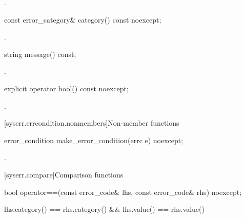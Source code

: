 \begin{itemdescr}
\pnum
\returns
{}.
\end{itemdescr}

%
\begin{itemdecl}
const error_category& category() const noexcept;
\end{itemdecl}

\begin{itemdescr}
\pnum
\returns
{}.
\end{itemdescr}

%
\begin{itemdecl}
string message() const;
\end{itemdecl}

\begin{itemdescr}
\pnum
\returns
{}.
\end{itemdescr}

%
\begin{itemdecl}
explicit operator bool() const noexcept;
\end{itemdecl}

\begin{itemdescr}
\pnum
\returns
{}.
\end{itemdescr}

[syserr.errcondition.nonmembers]{Non-member functions}

%
\begin{itemdecl}
error_condition make_error_condition(errc e) noexcept;
\end{itemdecl}

\begin{itemdescr}
\pnum
\returns
{}.
\end{itemdescr}

[syserr.compare]{Comparison functions}

%
\begin{itemdecl}
bool operator==(const error_code& lhs, const error_code& rhs) noexcept;
\end{itemdecl}

\begin{itemdescr}
\pnum
\returns
\begin{codeblock}
lhs.category() == rhs.category() && lhs.value() == rhs.value()
\end{codeblock}
\end{itemdescr}


